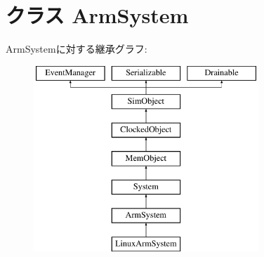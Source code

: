 \hypertarget{classArmSystem_1_1ArmSystem}{
\section{クラス ArmSystem}
\label{classArmSystem_1_1ArmSystem}
}
ArmSystemに対する継承グラフ:\begin{figure}[H]
\begin{center}
\leavevmode
\includegraphics[height=7cm]{classArmSystem_1_1ArmSystem}
\end{center}
\end{figure}
